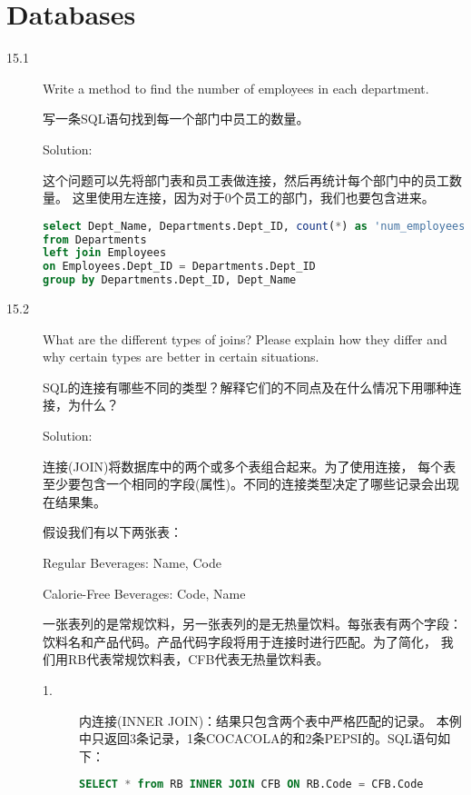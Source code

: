 \chapter{Databases}

\begin{description}
\item[15.1] Write a method to find the number of employees in each department.

写一条SQL语句找到每一个部门中员工的数量。

Solution: 

这个问题可以先将部门表和员工表做连接，然后再统计每个部门中的员工数量。 这里使用左连接，因为对于0个员工的部门，我们也要包含进来。
\begin{lstlisting}[language=SQL]
select Dept_Name, Departments.Dept_ID, count(*) as 'num_employees'
from Departments
left join Employees
on Employees.Dept_ID = Departments.Dept_ID
group by Departments.Dept_ID, Dept_Name
\end{lstlisting}


\item[15.2] What are the different types of joins? Please explain how they differ and why certain types are better in certain situations.

SQL的连接有哪些不同的类型？解释它们的不同点及在什么情况下用哪种连接，为什么？

Solution: 

连接(JOIN)将数据库中的两个或多个表组合起来。为了使用连接， 每个表至少要包含一个相同的字段(属性)。不同的连接类型决定了哪些记录会出现在结果集。

假设我们有以下两张表：

Regular Beverages: Name, Code

Calorie-Free Beverages: Code, Name

一张表列的是常规饮料，另一张表列的是无热量饮料。每张表有两个字段： 饮料名和产品代码。产品代码字段将用于连接时进行匹配。为了简化， 我们用RB代表常规饮料表，CFB代表无热量饮料表。
\begin{description}
\item[1.] 内连接(INNER JOIN)：结果只包含两个表中严格匹配的记录。 本例中只返回3条记录，1条COCACOLA的和2条PEPSI的。SQL语句如下：
  \begin{lstlisting}[language=SQL]
    SELECT * from RB INNER JOIN CFB ON RB.Code = CFB.Code
  \end{lstlisting}


\end{description}
\end{description}
